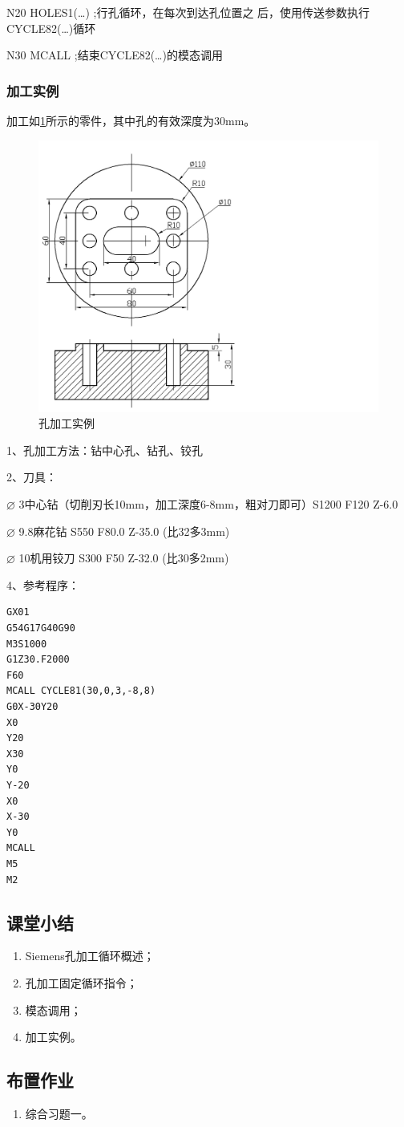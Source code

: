 N20 HOLES1(…)    ;行孔循环，在每次到达孔位置之
后，使用传送参数执行CYCLE82(…)循环 

N30 MCALL    ;结束CYCLE82(…)的模态调用

\subsubsection{加工实例}

加工如\ref{fig:21-2}所示的零件，其中孔的有效深度为30mm。

\begin{figure}
	\centering
	\includegraphics[width=0.5\linewidth,trim=0 0 450  0,clip]{data/image/21-2}
	\caption{孔加工实例}
	\label{fig:21-2}
\end{figure}

1、孔加工方法：钻中心孔、钻孔、铰孔

2、刀具：

$\varnothing $ 3中心钻（切削刃长10mm，加工深度6-8mm，粗对刀即可）S1200 F120 Z-6.0

$\varnothing $ 9.8麻花钻 S550 F80.0 Z-35.0 (比32多3mm)

$\varnothing $ 10机用铰刀 S300 F50 Z-32.0 (比30多2mm)

4、参考程序：
\begin{lstlisting}
GX01
G54G17G40G90
M3S1000
G1Z30.F2000
F60
MCALL CYCLE81(30,0,3,-8,8)
G0X-30Y20
X0
Y20
X30
Y0
Y-20
X0
X-30
Y0
MCALL
M5
M2
\end{lstlisting}



\subsection{课堂小结}
\begin{enumerate}[1、]
\item Siemens孔加工循环概述；
\item 孔加工固定循环指令；
\item 模态调用；
\item 加工实例。
\end{enumerate}

\vfill
\subsection{布置作业}
\begin{enumerate}[1、]
	\item 综合习题一。
\end{enumerate}
\vfill